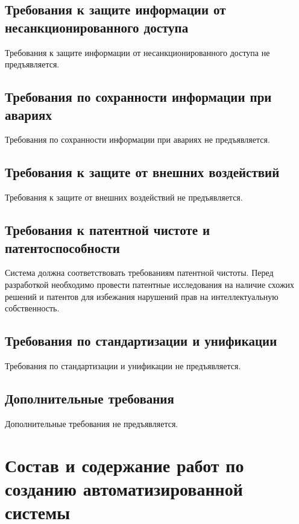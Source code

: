 \subsection{Требования к защите информации от несанкционированного доступа}

Требования к защите информации от несанкционированного доступа
не предъявляется.

\subsection{Требования по сохранности информации при авариях}

Требования по сохранности информации при авариях не предъявляется.

\subsection{Требования к защите от внешних воздействий}

Требования к защите от внешних воздействий не предъявляется.

\subsection{Требования к патентной чистоте и патентоспособности}

Система должна соответствовать требованиям патентной чистоты.
Перед разработкой необходимо провести патентные исследования
на наличие схожих решений и патентов
для избежания нарушений прав на интеллектуальную собственность.

\subsection{Требования по стандартизации и унификации}

Требования по стандартизации и унификации не предъявляется.

\subsection{Дополнительные требования}

Дополнительные требования не предъявляется.

\section{Состав и содержание работ по созданию автоматизированной системы}

